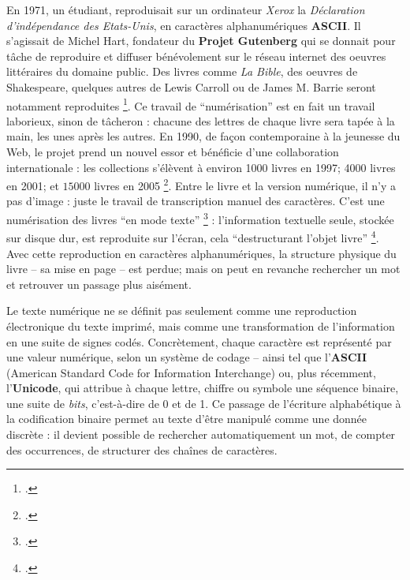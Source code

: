 En 1971, un étudiant, reproduisait sur un ordinateur \emph{Xerox} la \emph{Déclaration d'indépendance des Etats-Unis}, en caractères alphanumériques \textbf{ASCII}. Il s'agissait de Michel Hart, fondateur du \textbf{Projet Gutenberg} qui se donnait pour tâche de reproduire et diffuser bénévolement sur le réseau internet des oeuvres littéraires du domaine public. Des livres comme \emph{La Bible}, des oeuvres de Shakespeare, quelques autres de Lewis Carroll ou de James M. Barrie seront notamment reproduites \footcite[][]{lebert}. Ce travail de \enquote{numérisation} est en fait un travail laborieux, sinon de tâcheron : chacune des lettres de chaque livre sera tapée à la main, les unes après les autres. En 1990, de façon contemporaine à la jeunesse du Web, le projet prend un nouvel essor et bénéficie d'une collaboration internationale : les collections s'élèvent à environ 1000 livres en 1997; 4000 livres en 2001; et $15000$ livres en 2005 \footcite[][]{lebert}. Entre le livre et la version numérique, il n'y a pas d'image : juste le travail de transcription manuel des caractères. C'est une numérisation des livres \enquote{en mode texte} \footcite[][30-33]{bermesbook} : l'information textuelle seule, stockée sur disque dur, est reproduite sur l'écran, cela \enquote{destructurant l'objet livre} \footcite[][]{bermesbook}. Avec cette reproduction en caractères alphanumériques, la structure physique du livre -- sa mise en page -- est perdue; mais on peut en revanche rechercher un mot et retrouver un passage plus aisément. 

Le texte numérique ne se définit pas seulement comme une reproduction électronique du texte imprimé, mais comme une transformation de l’information en une suite de signes codés. Concrètement, chaque caractère est représenté par une valeur numérique, selon un système de codage -- ainsi tel que l’\textbf{ASCII} (American Standard Code for Information Interchange) ou, plus récemment, l’\textbf{Unicode}, qui attribue à chaque lettre, chiffre ou symbole une séquence binaire, une suite de \emph{bits}, c’est-à-dire de 0 et de 1. Ce passage de l’écriture alphabétique à la codification binaire permet au texte d’être manipulé comme une donnée discrète : il devient possible de rechercher automatiquement un mot, de compter des occurrences, de structurer des chaînes de caractères.

